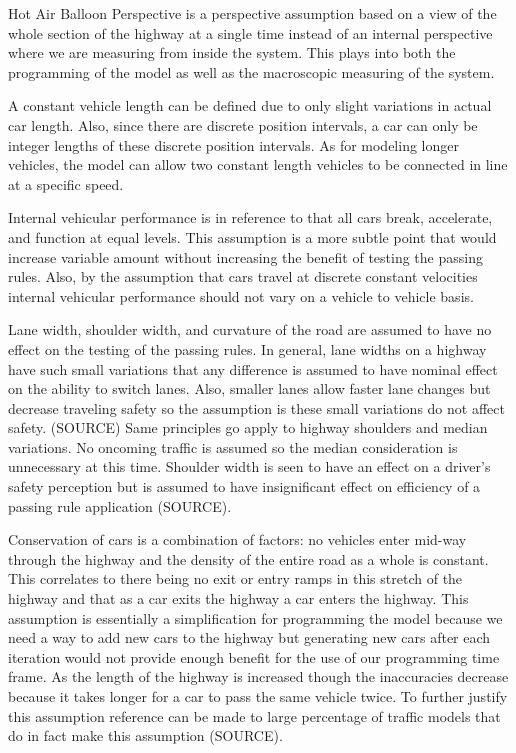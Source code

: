 \documentclass{amsart}
\begin{document}
		Hot Air Balloon Perspective is a perspective assumption based on a view of the whole section of the highway at a single time instead of an internal perspective where we are measuring from inside the system.  This plays into both the programming of the model as well as the macroscopic measuring of the system. 
		
		A constant vehicle length can be defined due to only slight variations in actual car length. Also, since there are discrete position intervals, a car can only be integer lengths of these discrete position intervals. As for modeling longer vehicles, the model can allow two constant length vehicles to be connected in line at a specific speed.

		Internal vehicular performance is in reference to that all cars break, accelerate, and function at equal levels.  This assumption is a more subtle point that would increase variable amount without increasing the benefit of testing the passing rules.  Also, by the assumption that cars travel at discrete constant velocities internal vehicular performance should not vary on a vehicle to vehicle basis.   

		Lane width, shoulder width, and curvature of the road are assumed to have no effect on the testing of the passing rules.  In general, lane widths on a highway have such small variations that any difference is assumed to have nominal effect on the ability to switch lanes.  Also, smaller lanes allow faster lane changes but decrease traveling safety so the assumption is these small variations do not affect safety.  (SOURCE) Same principles go apply to highway shoulders and median variations. No oncoming traffic is assumed so the median consideration is unnecessary at this time.  Shoulder width is seen to have an effect on a driver’s safety perception but is assumed to have insignificant effect on efficiency of a passing rule application (SOURCE).
		 
		 Conservation of cars is a combination of factors: no vehicles enter mid-way through the highway and the density of the entire road as a whole is constant.  This correlates to there being no exit or entry ramps in this stretch of the highway and that as a car exits the highway a car enters the highway.  This assumption is essentially a simplification for programming the model because we need a way to add new cars to the highway but generating new cars after each iteration would not provide enough benefit for the use of our programming time frame. As the length of the highway is increased though the inaccuracies decrease because it takes longer for a car to pass the same vehicle twice.  To further justify this assumption reference can be made to large percentage of traffic models that do in fact make this assumption (SOURCE).  
		 
\end{document}
